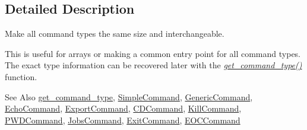 \subsection{Detailed Description}
Make all command types the same size and interchangeable. 

This is useful for arrays or making a common entry point for all command types. The exact type information can be recovered later with the {\itshape \hyperlink{command_8c_a1708aa65874060aa7ef99bf9e1671f5c}{get\-\_\-command\-\_\-type()}} function.

\begin{DoxySeeAlso}{See Also}
\hyperlink{command_8h_a1708aa65874060aa7ef99bf9e1671f5c}{get\-\_\-command\-\_\-type}, \hyperlink{structSimpleCommand}{Simple\-Command}, \hyperlink{structGenericCommand}{Generic\-Command}, \hyperlink{command_8h_a8dc22d719c880c1ffcd9bc2dc5773633}{Echo\-Command}, \hyperlink{structExportCommand}{Export\-Command}, \hyperlink{structCDCommand}{C\-D\-Command}, \hyperlink{structKillCommand}{Kill\-Command}, \hyperlink{command_8h_a0c0e44e3e2b07b1e9b48023205cb4ca2}{P\-W\-D\-Command}, \hyperlink{command_8h_a027de4ed5fe4b0313c6c8ee0c2c1806b}{Jobs\-Command}, \hyperlink{command_8h_a354cb87bc40859e5595de56b675732bc}{Exit\-Command}, \hyperlink{command_8h_ae5bf5cf7a34428c221f28179034dd125}{E\-O\-C\-Command} 
\end{DoxySeeAlso}


